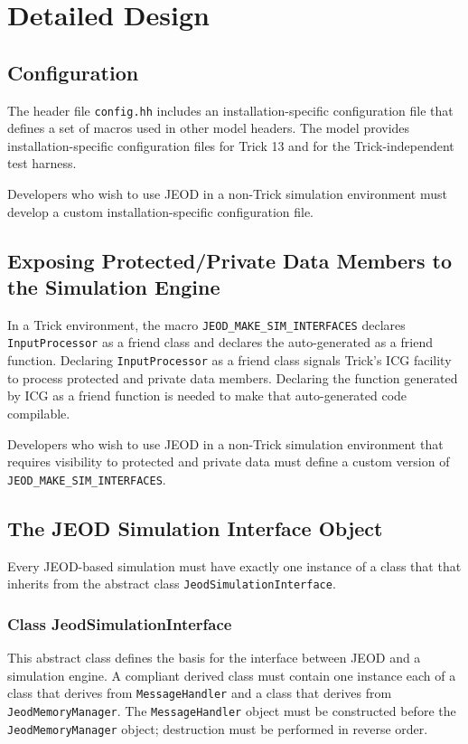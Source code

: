 \section{Detailed Design}

\subsection{Configuration}
The header file \verb|config.hh| includes an installation-specific
configuration file that defines a set of macros used in other model headers.
The model provides installation-specific configuration files for
Trick 13 and for the Trick-independent test harness.

Developers who wish to use JEOD in a non-Trick simulation environment
must develop a custom installation-specific configuration file.

\subsection{Exposing Protected/Private Data Members to the Simulation Engine}
In a Trick environment, the macro \verb|JEOD_MAKE_SIM_INTERFACES|
declares \verb|InputProcessor| as a friend class and declares the
auto-generated 
as a friend function.
Declaring \verb|InputProcessor| as a friend class signals Trick's ICG facility
to process protected and private data members. Declaring the function
generated by ICG as a friend function is needed to make that auto-generated
code compilable.

Developers who wish to use JEOD in a non-Trick simulation environment
that requires visibility to protected and private data must define a
custom version of \verb|JEOD_MAKE_SIM_INTERFACES|.


\subsection{The JEOD Simulation Interface Object}
Every JEOD-based simulation must have exactly one instance of a class that
that inherits from the abstract class \verb|JeodSimulationInterface|.
\subsubsection{Class JeodSimulationInterface}
This abstract class defines the basis for the interface between JEOD and a
simulation engine. A compliant derived class must contain one instance each
of a class that derives from \verb|MessageHandler| and a class that derives from
\verb|JeodMemoryManager|. The \verb|MessageHandler| object must be constructed
before the \verb|JeodMemoryManager| object; destruction must be performed in
reverse order.

